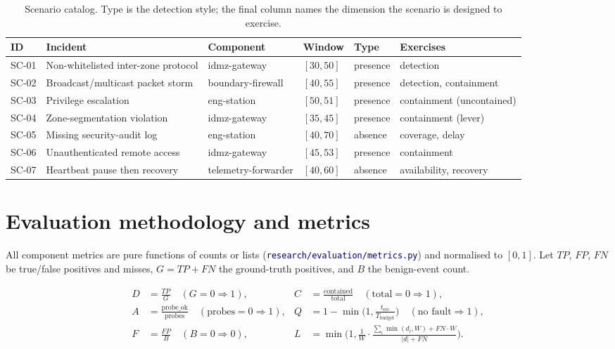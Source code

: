 \documentclass[11pt]{article}
\newcommand{\file}[1]{\textcolor{navy}{\texttt{\small #1}}}
\begin{document}
\begin{table}[h]
\centering
\caption{Scenario catalog. Type is the detection style; the final column names the
dimension the scenario is designed to exercise.}
\label{tab:scen}
\footnotesize
\begin{tabular}{p{0.9cm} p{4.1cm} p{2.3cm} p{1.1cm} p{1.0cm} p{2.4cm}}
\toprule
\textbf{ID} & \textbf{Incident} & \textbf{Component} & \textbf{Window} & \textbf{Type} & \textbf{Exercises}\\
\midrule
SC-01 & Non-whitelisted inter-zone protocol & idmz-gateway & $[30,50]$ & presence & detection\\
SC-02 & Broadcast/multicast packet storm & boundary-firewall & $[40,55]$ & presence & detection, containment\\
SC-03 & Privilege escalation & eng-station & $[50,51]$ & presence & containment (uncontained)\\
SC-04 & Zone-segmentation violation & idmz-gateway & $[35,45]$ & presence & containment (lever)\\
SC-05 & Missing security-audit log & eng-station & $[40,70]$ & absence & coverage, delay\\
SC-06 & Unauthenticated remote access & idmz-gateway & $[45,53]$ & presence & containment\\
SC-07 & Heartbeat pause then recovery & telemetry-forwarder & $[40,60]$ & absence & availability, recovery\\
\bottomrule
\end{tabular}
\end{table}

\section{Evaluation methodology and metrics}
\label{sec:metrics}
All component metrics are pure functions of counts or lists
(\file{research/evaluation/metrics.py}) and normalised to $[0,1]$. Let $TP$, $FP$,
$FN$ be true/false positives and misses, $G=TP+FN$ the ground-truth positives, and
$B$ the benign-event count.

\begin{align}
D &= \frac{TP}{G} \quad (G{=}0 \Rightarrow 1), &
C &= \frac{\text{contained}}{\text{total}} \quad (\text{total}{=}0 \Rightarrow 1),\\
A &= \frac{\text{probe\_ok}}{\text{probes}} \quad (\text{probes}{=}0 \Rightarrow 1), &
Q &= 1-\min\!\Big(1,\tfrac{t_\text{rec}}{T_\text{budget}}\Big) \quad (\text{no fault}\Rightarrow 1),\\
F &= \frac{FP}{B} \quad (B{=}0 \Rightarrow 0), &
L &= \min\!\Big(1,\tfrac{1}{W}\cdot\tfrac{\sum_i \min(d_i,W) + FN\cdot W}{|d|+FN}\Big).
\end{align}
\end{document}
